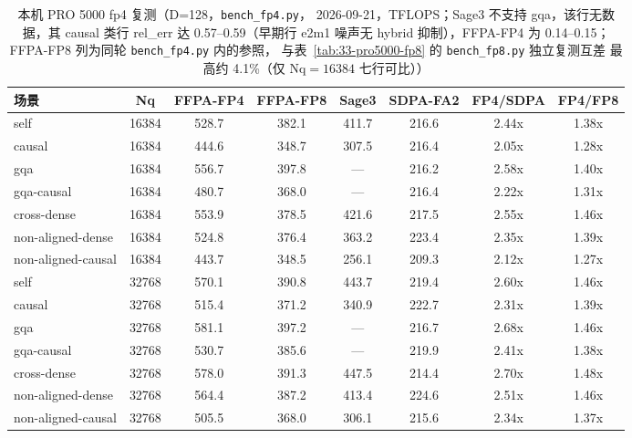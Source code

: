 \begin{table}[!htbp]
  \centering\small
  \caption{本机 PRO 5000 fp4 复测（D=128，\texttt{bench\_fp4.py}，
  2026-09-21，TFLOPS；Sage3 不支持 gqa，该行无数据，其 causal 类行
  rel\_err 达 0.57--0.59（早期行 e2m1 噪声无 hybrid 抑制），FFPA-FP4
  为 0.14--0.15；FFPA-FP8 列为同轮 \texttt{bench\_fp4.py} 内的参照，
  与表~\ref{tab:33-pro5000-fp8} 的 \texttt{bench\_fp8.py} 独立复测互差
  最高约 4.1\%（仅 Nq${=}16384$ 七行可比））}\label{tab:33-pro5000-fp4}
  \begin{tabular}{lccccccc}
    \toprule
    场景 & Nq & FFPA-FP4 & FFPA-FP8 & Sage3 & SDPA-FA2 & FP4/SDPA & FP4/FP8 \\
    \midrule
    self               & 16384 & 528.7 & 382.1 & 411.7 & 216.6 & 2.44x & 1.38x \\
    causal             & 16384 & 444.6 & 348.7 & 307.5 & 216.4 & 2.05x & 1.28x \\
    gqa                & 16384 & 556.7 & 397.8 & ---   & 216.2 & 2.58x & 1.40x \\
    gqa-causal         & 16384 & 480.7 & 368.0 & ---   & 216.4 & 2.22x & 1.31x \\
    cross-dense        & 16384 & 553.9 & 378.5 & 421.6 & 217.5 & 2.55x & 1.46x \\
    non-aligned-dense  & 16384 & 524.8 & 376.4 & 363.2 & 223.4 & 2.35x & 1.39x \\
    non-aligned-causal & 16384 & 443.7 & 348.5 & 256.1 & 209.3 & 2.12x & 1.27x \\
    \midrule
    self               & 32768 & 570.1 & 390.8 & 443.7 & 219.4 & 2.60x & 1.46x \\
    causal             & 32768 & 515.4 & 371.2 & 340.9 & 222.7 & 2.31x & 1.39x \\
    gqa                & 32768 & 581.1 & 397.2 & ---   & 216.7 & 2.68x & 1.46x \\
    gqa-causal         & 32768 & 530.7 & 385.6 & ---   & 219.9 & 2.41x & 1.38x \\
    cross-dense        & 32768 & 578.0 & 391.3 & 447.5 & 214.4 & 2.70x & 1.48x \\
    non-aligned-dense  & 32768 & 564.4 & 387.2 & 413.4 & 224.6 & 2.51x & 1.46x \\
    non-aligned-causal & 32768 & 505.5 & 368.0 & 306.1 & 215.6 & 2.34x & 1.37x \\
    \bottomrule
  \end{tabular}
\end{table}

\FloatBarrier

